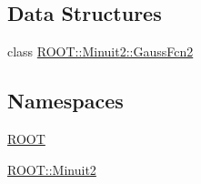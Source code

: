 \subsection*{Data Structures}
\begin{DoxyCompactItemize}
\item 
class \mbox{\hyperlink{classROOT_1_1Minuit2_1_1GaussFcn2}{R\+O\+O\+T\+::\+Minuit2\+::\+Gauss\+Fcn2}}
\end{DoxyCompactItemize}
\subsection*{Namespaces}
\begin{DoxyCompactItemize}
\item 
 \mbox{\hyperlink{namespaceROOT}{R\+O\+OT}}
\item 
 \mbox{\hyperlink{namespaceROOT_1_1Minuit2}{R\+O\+O\+T\+::\+Minuit2}}
\end{DoxyCompactItemize}
